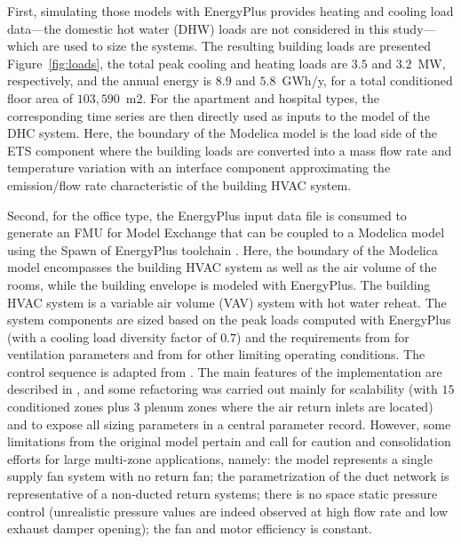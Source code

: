 First, simulating those models with EnergyPlus provides heating and cooling load data---the domestic hot water (DHW) loads are not considered in this study---which are used to size the systems.
The resulting building loads are presented Figure~\ref{fig:loads}, the total peak cooling and heating loads are $3.5$ and $3.2$~MW, respectively, and the annual energy is $8.9$ and $5.8$~GWh/y, for a total conditioned floor area of $103,590$~m2.
For the apartment and hospital types, the corresponding time series are then directly used as inputs to the model of the DHC system.
Here, the boundary of the Modelica model is the load side of the ETS component where the building loads are converted into a mass flow rate and temperature variation with an interface component approximating the emission/flow rate characteristic of the building HVAC system.

Second, for the office type, the EnergyPlus input data file is consumed to generate an FMU for Model Exchange that can be coupled to a Modelica model using the Spawn of EnergyPlus toolchain \cite{Wetter2020}. Here, the boundary of the Modelica model encompasses the building HVAC system as well as the air volume of the rooms, while the building envelope is modeled with EnergyPlus.
The building HVAC system is a variable air volume (VAV) system with hot water reheat.
The system components are sized based on the peak loads computed with EnergyPlus (with a cooling load diversity factor of $0.7$) and the requirements from \cite{ASHRAE62.1} for ventilation parameters and from \cite{ASHRAE90.1} for other limiting operating conditions.
The control sequence is adapted from \cite{ASHRAE2006}.
The main features of the implementation are described in \cite{Wetter2022}, and some refactoring was carried out mainly for scalability (with $15$ conditioned zones plus $3$ plenum zones where the air return inlets are located) and to expose all sizing parameters in a central parameter record. However, some limitations from the original model pertain and call for caution and consolidation efforts for large multi-zone applications, namely: the model represents a single supply fan system with no return fan; the parametrization of the duct network is representative of a non-ducted return systems; there is no space static pressure control (unrealistic pressure values are indeed observed at high flow rate and low exhaust damper opening); the fan and motor efficiency is constant.

